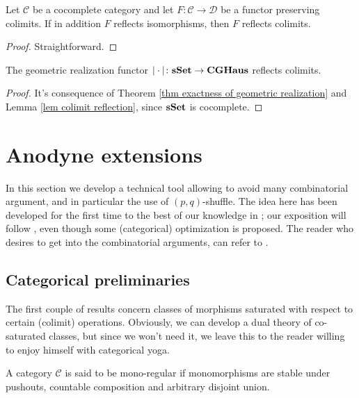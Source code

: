 \begin{refsection}
\begin{lemma} \label{lem colimit reflection}
Let $\mathcal C$ be a cocomplete category and let $F \colon \mathcal C \to \mathcal D$ be a functor preserving colimits. If in addition $F$ reflects isomorphisms, then $F$ reflects colimits.
\end{lemma}

\begin{proof}
Straightforward.
\end{proof}

\begin{cor} \label{cor colimit in sset}
The geometric realization functor $| \cdot | \colon \mathbf{sSet} \to \mathbf{CGHaus}$ reflects colimits.
\end{cor}

\begin{proof}
It's consequence of Theorem \ref{thm exactness of geometric realization} and Lemma \ref{lem colimit reflection}, since $\mathbf{sSet}$ is cocomplete.
\end{proof}

\section{Anodyne extensions}

In this section we develop a technical tool allowing to avoid many combinatorial argument, and in particular the use of $(p,q)$-shuffle. The idea here has been developed for the first time to the best of our knowledge in \cite{gz}; our exposition will follow \cite[Ch. I.4]{gj}, even though some (categorical) optimization is proposed. The reader who desires to get into the combinatorial arguments, can refer to \cite{may}.

\subsection{Categorical preliminaries}

The first couple of results concern classes of morphisms saturated with respect to certain (colimit) operations. Obviously, we can develop a dual theory of co-saturated classes, but since we won't need it, we leave this to the reader willing to enjoy himself with categorical yoga.

\begin{defin}
A category $\mathcal C$ is said to be mono-regular if monomorphisms are stable under pushouts, countable composition and arbitrary disjoint union.
\end{defin}


\end{refsection}
